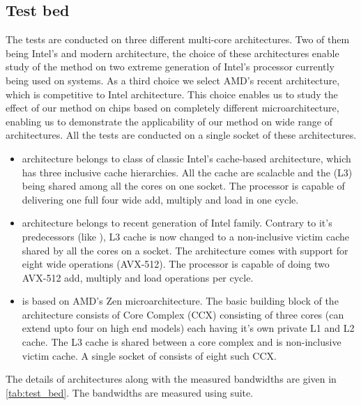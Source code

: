 \subsection{Test bed}
The tests are conducted on three different multi-core architectures. Two of them being Intel's \IVB and modern \SKX architecture, the choice of these architectures enable study of the method on two extreme generation of Intel's processor currently being used on \HPC systems. As a third choice we select AMD's recent \EPY architecture, which is competitive to Intel \SKX architecture. This choice enables us to study the effect of our method on chips based on completely different microarchitecture, enabling us to demonstrate the applicability of our method on wide range of architectures. All the tests are conducted on a single socket of these architectures. 

\begin{itemize}
	\item \Intel \IVB architecture belongs to class of classic Intel's cache-based architecture, which has three inclusive cache  hierarchies. All the cache are scalacble and the \LLC (L3) being shared among all the cores on one socket. The processor is capable of delivering one full four wide \SIMD add, multiply and load in one cycle. 
	\item \Intel \SKX architecture belongs to recent generation of Intel family. Contrary to it's predecessors (like \IVB), L3 cache is now changed to a non-inclusive victim cache shared by all the cores on a socket. The architecture comes with support for eight wide \SIMD operations (AVX-512). The processor is capable of doing two AVX-512 add, multiply and load operations per cycle.
	\item \AMD \EPY is based on AMD's Zen microarchitecture. The basic building block of the architecture consists of Core Complex (CCX) consisting of three cores (can extend upto four on high end models) each having it's own private L1 and L2 cache. The L3 cache is shared between a core complex and is non-inclusive victim cache. A single socket of \EPY consists of eight such CCX.
	
\end{itemize}
The details of architectures along with the measured bandwidths are given in \cref{tab:test_bed}. The bandwidths are measured using \likwidBench suite.

